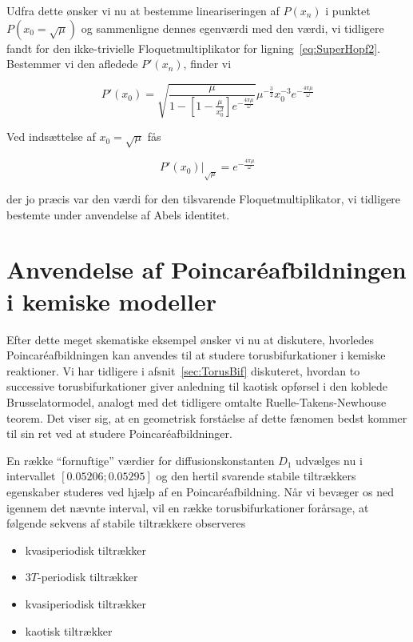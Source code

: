 Udfra dette {\o}nsker vi nu at bestemme lineariseringen af
$P(x_n)$ i punktet $P(x_0 = \sqrt{\mu})$ og sammenligne
dennes egenv{\ae}rdi med den v{\ae}rdi, vi tidligere fandt
for den ikke-trivielle Floquetmultiplikator for
ligning~\ref{eq:SuperHopf2}. Bestemmer vi den afledede
$P'(x_n)$, finder vi

\begin{equation}
 P'(x_0) = 
 \sqrt{\frac{\mu}{1-[1-\frac{\mu}{x_0^2}]e^{-\frac{4\pi\mu}{\omega}}}}
 \mu^{-\frac{3}{2}} x_0^{-3}e^{-\frac{4\pi\mu}{\omega}}
\end{equation}

Ved inds{\ae}ttelse af $x_0=\sqrt{\mu}$ f{\aa}s

\begin{equation}
 \left.P'(x_0)\right|_{\sqrt{\mu}} = e^{-\frac{4\pi\mu}{\omega}}
\end{equation}

der jo pr{\ae}cis var den v{\ae}rdi for den tilsvarende
Floquetmultiplikator, vi tid\-ligere bestemte under
anvendelse af Abels identitet.


\section{Anvendelse af Poincar\'{e}afbild\-ningen i kemiske modeller}
\label{PoincareApplied}
Efter dette meget skematiske eksempel {\o}nsker vi nu at
diskutere, hvorledes Poincar\'{e}afbild\-ningen kan
anvendes til at studere torusbifurkationer i kemiske
reaktioner. Vi har tidligere i afsnit~\ref{sec:TorusBif}
diskuteret, hvordan to successive torus\-bifurkationer giver
anledning til kaotisk opf{\o}rsel i den koblede
Brusselatormodel, analogt med det tidligere omtalte
Ruelle-Takens-Newhouse teorem. Det viser sig, at en
geometrisk forst{\aa}else af dette f{\ae}nomen bedst kommer
til sin ret ved at studere Poincar\'{e}afbild\-ninger.

\vspace{4.0mm}
En r{\ae}kke ``fornuftige'' v{\ae}rdier for
diffusionskonstanten $D_1$ udv{\ae}lges nu i intervallet
$[0.05206;0.05295]$ og den hertil svarende stabile
tiltr{\ae}kkers egenskaber studeres ved hj{\ae}lp af en
Poincar\'{e}afbild\-ning. N{\aa}r vi bev{\ae}ger os ned
igennem det n{\ae}vnte interval, vil en r{\ae}kke
torusbifurkationer for{\aa}rsage, at f{\o}lgende sekvens af
stabile tiltr{\ae}kkere observeres

\begin{itemize}
  \item kvasiperiodisk tiltr{\ae}kker
  \item $3T$-periodisk tiltr{\ae}kker
  \item kvasiperiodisk tiltr{\ae}kker
  \item kaotisk tiltr{\ae}kker
\end{itemize}


